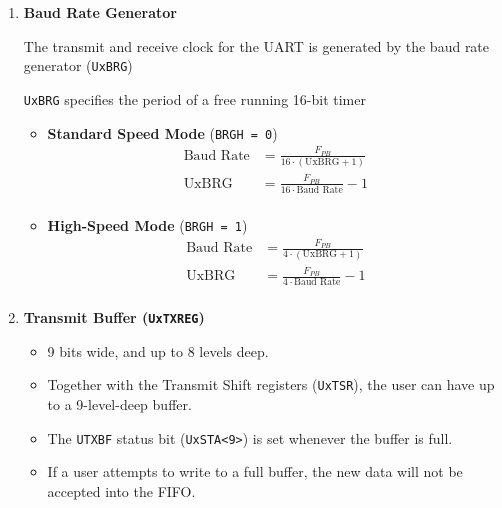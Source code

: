 \documentclass[a4paper]{article}
\begin{document}
\begin{enumerate}[label = \arabic*.]
    \item \textbf{Baud Rate Generator}
      \par The transmit and receive clock for the UART is generated by the baud rate generator (\verb|UxBRG|)
      \par \verb|UxBRG| specifies the period of a free running 16-bit timer
      \begin{itemize}[leftmargin = 1cm]
        \item \textbf{Standard Speed Mode} (\verb|BRGH = 0|)
          \begin{equation*}
            \begin{aligned}
              \text{Baud Rate} & = \frac{F_{PB} }{16 \cdot (\text{UxBRG} + 1)}   \\
              \text{UxBRG}     & = \frac{F_{PB} }{16 \cdot \text{Baud Rate}} - 1 \\
            \end{aligned}
          \end{equation*}
        \item \textbf{High-Speed Mode} (\verb|BRGH = 1|)
          \begin{equation*}
            \begin{aligned}
              \text{Baud Rate} & = \frac{F_{PB} }{4 \cdot (\text{UxBRG} + 1)}   \\
              \text{UxBRG}     & = \frac{F_{PB} }{4 \cdot \text{Baud Rate}} - 1 \\
            \end{aligned}
          \end{equation*}
      \end{itemize}

    \item \cprotect\textbf{Transmit Buffer (\verb|UxTXREG|)}
      \begin{itemize}[leftmargin = 0.5cm]
        \item 9 bits wide, and up to 8 levels deep.
        \item Together with the Transmit Shift registers (\verb|UxTSR|), the user can have up to a 9-level-deep buffer.
        \item The \verb|UTXBF| status bit (\verb|UxSTA<9>|) is set whenever the buffer is full.
        \item If a user attempts to write to a full buffer, the new data will not be accepted into the FIFO.    \end{itemize}


\end{enumerate}
\end{document}
